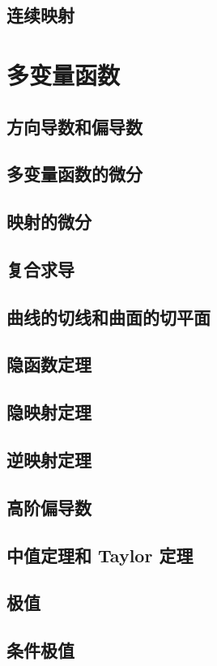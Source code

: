 \documentclass[a4paper, 11pt]{ctexbook}
\begin{document}
        \section{连续映射}
    \chapter{多变量函数}
        \section{方向导数和偏导数}
        \section{多变量函数的微分}
        \section{映射的微分}
        \section{复合求导}
        \section{曲线的切线和曲面的切平面}
        \section{隐函数定理}
        \section{隐映射定理}
        \section{逆映射定理}
        \section{高阶偏导数}
        \section{中值定理和 Taylor 定理}
        \section{极值}
        \section{条件极值}
\end{document}
